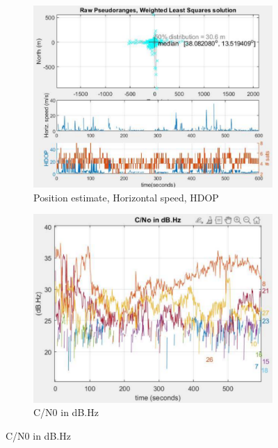 \begin{figure}[H]
  \begin{subfigure}{.22\textwidth}
  \centering
    \includegraphics[width=1\linewidth]{images/indoor_fig_4.pdf}
    \caption{Position estimate, Horizontal speed, HDOP}
    \label{fig:indoor_fig_4}
  \end{subfigure}
  \begin{subfigure}{.22\textwidth}
  \centering
    \includegraphics[width=1\linewidth]{images/indoor_fig_3.pdf}
    \caption{C/N0 in dB.Hz}
    \label{fig:indoor_fig_3}
  \end{subfigure}
  \vspace{10pt}
\end{figure}

